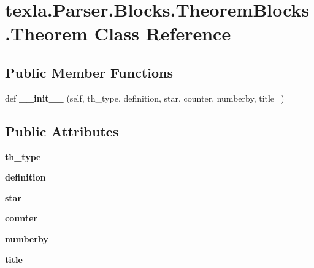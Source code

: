 \hypertarget{classtexla_1_1Parser_1_1Blocks_1_1TheoremBlocks_1_1Theorem}{}\section{texla.\+Parser.\+Blocks.\+Theorem\+Blocks.\+Theorem Class Reference}
\label{classtexla_1_1Parser_1_1Blocks_1_1TheoremBlocks_1_1Theorem}
\subsection*{Public Member Functions}
\begin{DoxyCompactItemize}
\item 
\hypertarget{classtexla_1_1Parser_1_1Blocks_1_1TheoremBlocks_1_1Theorem_a4ed44a6bbcb1d14b236fb469d6a524de}{}\label{classtexla_1_1Parser_1_1Blocks_1_1TheoremBlocks_1_1Theorem_a4ed44a6bbcb1d14b236fb469d6a524de} 
def {\bfseries \+\_\+\+\_\+init\+\_\+\+\_\+} (self, th\+\_\+type, definition, star, counter, numberby, title=\textquotesingle{}\textquotesingle{})
\end{DoxyCompactItemize}
\subsection*{Public Attributes}
\begin{DoxyCompactItemize}
\item 
\hypertarget{classtexla_1_1Parser_1_1Blocks_1_1TheoremBlocks_1_1Theorem_ae3f7f0082b83aba3f2d669201291d7c3}{}\label{classtexla_1_1Parser_1_1Blocks_1_1TheoremBlocks_1_1Theorem_ae3f7f0082b83aba3f2d669201291d7c3} 
{\bfseries th\+\_\+type}
\item 
\hypertarget{classtexla_1_1Parser_1_1Blocks_1_1TheoremBlocks_1_1Theorem_a21cee7a1b1d111f47545454527368e7d}{}\label{classtexla_1_1Parser_1_1Blocks_1_1TheoremBlocks_1_1Theorem_a21cee7a1b1d111f47545454527368e7d} 
{\bfseries definition}
\item 
\hypertarget{classtexla_1_1Parser_1_1Blocks_1_1TheoremBlocks_1_1Theorem_a0bc1b6699fcaa6b39a036e2619c1e1d5}{}\label{classtexla_1_1Parser_1_1Blocks_1_1TheoremBlocks_1_1Theorem_a0bc1b6699fcaa6b39a036e2619c1e1d5} 
{\bfseries star}
\item 
\hypertarget{classtexla_1_1Parser_1_1Blocks_1_1TheoremBlocks_1_1Theorem_a8eafc4fe56186b7b1dad639f4e14914d}{}\label{classtexla_1_1Parser_1_1Blocks_1_1TheoremBlocks_1_1Theorem_a8eafc4fe56186b7b1dad639f4e14914d} 
{\bfseries counter}
\item 
\hypertarget{classtexla_1_1Parser_1_1Blocks_1_1TheoremBlocks_1_1Theorem_a3c49decf41fd5931245adb4d24e05c0c}{}\label{classtexla_1_1Parser_1_1Blocks_1_1TheoremBlocks_1_1Theorem_a3c49decf41fd5931245adb4d24e05c0c} 
{\bfseries numberby}
\item 
\hypertarget{classtexla_1_1Parser_1_1Blocks_1_1TheoremBlocks_1_1Theorem_a9f3690b53ea81ce58e43fc5fef8af354}{}\label{classtexla_1_1Parser_1_1Blocks_1_1TheoremBlocks_1_1Theorem_a9f3690b53ea81ce58e43fc5fef8af354} 
{\bfseries title}
\end{DoxyCompactItemize}


